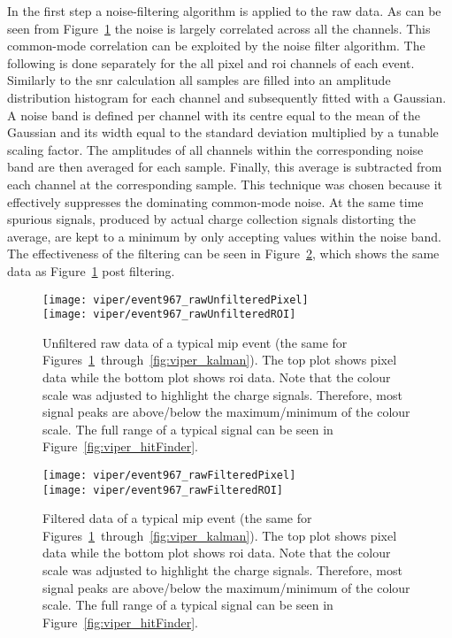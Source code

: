 In the first step a noise-filtering algorithm is applied to the raw data.
As can be seen from Figure~\ref{fig:viper_unfilteredRawData} the noise is largely correlated across all the channels.
This common-mode correlation can be exploited by the noise filter algorithm.
The following is done separately for the all pixel and \gls{roi} channels of each event.
Similarly to the \gls{snr} calculation all samples are filled into an amplitude distribution histogram for each channel and subsequently fitted with a Gaussian.
A noise band is defined per channel with its centre equal to the mean of the Gaussian and its width equal to the standard deviation multiplied by a tunable scaling factor.
The amplitudes of all channels within the corresponding noise band are then averaged for each sample.
Finally, this average is subtracted from each channel at the corresponding sample.
This technique was chosen because it effectively suppresses the dominating common-mode noise.
At the same time spurious signals, produced by actual charge collection signals distorting the average, are kept to a minimum by only accepting values within the noise band.
The effectiveness of the filtering can be seen in Figure~\ref{fig:viper_filteredRawData}, which shows the same data as Figure~\ref{fig:viper_unfilteredRawData} post filtering.

\begin{figure}[htb]
	\centering
	\texttt{[image: viper/event967\_rawUnfilteredPixel]}\\
	\texttt{[image: viper/event967\_rawUnfilteredROI]}
	\caption[Unfiltered raw data of typical pixel demonstrator event]{%
		Unfiltered raw data of a typical \acrshort{mip} event (the same for Figures~\ref{fig:viper_unfilteredRawData}~through~\ref{fig:viper_kalman}).
		The top plot shows pixel data while the bottom plot shows \acrshort{roi} data.
		Note that the colour scale was adjusted to highlight the charge signals.
		Therefore, most signal peaks are above/below the maximum/minimum of the colour scale.
		The full range of a typical signal can be seen in Figure~\ref{fig:viper_hitFinder}.
	}
	\label{fig:viper_unfilteredRawData}
\end{figure}

\begin{figure}[htb]
	\centering
	\texttt{[image: viper/event967\_rawFilteredPixel]}\\
	\texttt{[image: viper/event967\_rawFilteredROI]}
	\caption[Filtered data of typical pixel demonstrator event]{%
		Filtered data of a typical \acrshort{mip} event (the same for Figures~\ref{fig:viper_unfilteredRawData}~through~\ref{fig:viper_kalman}).
		The top plot shows pixel data while the bottom plot shows \acrshort{roi} data.
		Note that the colour scale was adjusted to highlight the charge signals.
		Therefore, most signal peaks are above/below the maximum/minimum of the colour scale.
		The full range of a typical signal can be seen in Figure~\ref{fig:viper_hitFinder}.
	}
	\label{fig:viper_filteredRawData}
\end{figure}

